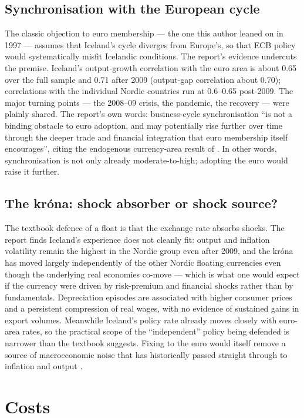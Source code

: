 \documentclass[11pt,a4paper]{article}
\begin{document}
\subsection{Synchronisation with the European cycle}
The classic objection to euro membership --- the one this author leaned on in
1997 --- assumes that Iceland's cycle diverges from Europe's, so that ECB
policy would systematically misfit Icelandic conditions. The report's evidence
undercuts the premise. Iceland's output-growth correlation with the euro area
is about 0.65 over the full sample and 0.71 after 2009 (output-gap
correlation about 0.70); correlations with the individual Nordic countries
run at 0.6--0.65 post-2009. The major turning points --- the 2008--09 crisis,
the pandemic, the recovery --- were plainly shared. The report's own words:
business-cycle synchronisation ``is not a binding obstacle to euro adoption,
and may potentially rise further over time through the deeper trade and
financial integration that euro membership itself encourages'', citing the
endogenous currency-area result of \citet{frankelrose1998}. In other words,
synchronisation is not only already moderate-to-high; adopting the euro would
raise it further.

\subsection{The kr\'ona: shock absorber or shock source?}
The textbook defence of a float is that the exchange rate absorbs shocks. The
report finds Iceland's experience does not cleanly fit: output and inflation
volatility remain the highest in the Nordic group even after 2009, and the
kr\'ona has moved largely independently of the other Nordic floating
currencies even though the underlying real economies co-move --- which is what
one would expect if the currency were driven by risk-premium and financial
shocks rather than by fundamentals. Depreciation episodes are associated with
higher consumer prices and a persistent compression of real wages, with no
evidence of sustained gains in export volumes. Meanwhile Iceland's policy rate
already moves closely with euro-area rates, so the practical scope of the
``independent'' policy being defended is narrower than the textbook suggests.
Fixing to the euro would itself remove a source of macroeconomic noise that
has historically passed straight through to inflation and output
\citep{mann2026}.

\section{Costs}
\end{document}
